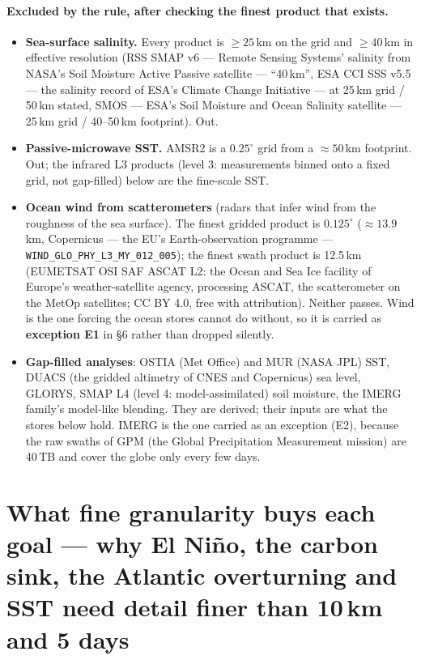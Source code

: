 \documentclass[10pt]{article}
\newcommand{\code}[1]{\texttt{#1}}
\begin{document}
\paragraph{Excluded by the rule, after checking the finest product that exists.}
\begin{itemize}\itemsep1pt
\item \textbf{Sea-surface salinity.} Every product is $\ge 25$\,km on the grid
and $\ge 40$\,km in effective resolution (RSS SMAP v6 --- Remote Sensing Systems' salinity from NASA's Soil Moisture Active Passive satellite --- ``40\,km'', ESA CCI SSS v5.5 --- the salinity record of ESA's Climate Change Initiative ---
at 25\,km grid / 50\,km stated, SMOS --- ESA's Soil Moisture and Ocean Salinity satellite --- 25\,km grid / 40--50\,km footprint). Out.
\item \textbf{Passive-microwave SST.} AMSR2 is a $0.25^\circ$ grid from a
$\approx 50$\,km footprint. Out; the infrared L3 products (level 3: measurements binned onto a fixed grid, not gap-filled) below are the
fine-scale SST.
\item \textbf{Ocean wind from scatterometers} (radars that infer wind from the roughness of the sea surface). The finest gridded product is
$0.125^\circ$ ($\approx 13.9$\,km, Copernicus --- the EU's Earth-observation programme ---\allowbreak \code{WIND\_GLO\_PHY\_L3\_MY\_012\_005});
the finest swath product is 12.5\,km (EUMETSAT OSI SAF ASCAT L2: the Ocean and Sea Ice facility of Europe's weather-satellite agency, processing ASCAT, the scatterometer on the MetOp satellites; CC BY 4.0, free with attribution).
Neither passes. Wind is the one forcing the ocean stores cannot do without,
so it is carried as \textbf{exception E1} in \S6 rather than dropped silently.
\item \textbf{Gap-filled analyses}: OSTIA (Met Office) and MUR (NASA JPL) SST, DUACS (the gridded altimetry of CNES and Copernicus) sea level,
GLORYS, SMAP L4 (level 4: model-assimilated) soil moisture, the IMERG family's model-like blending. They
are derived; their inputs are what the stores below hold. IMERG is the one
carried as an exception (E2), because the raw swaths of GPM (the Global Precipitation Measurement mission) are 40\,TB and cover
the globe only every few days.
\end{itemize}

\section{What fine granularity buys each goal --- why El Ni\~no, the carbon sink, the Atlantic overturning and SST need detail finer than 10\,km and 5 days}
\end{document}
